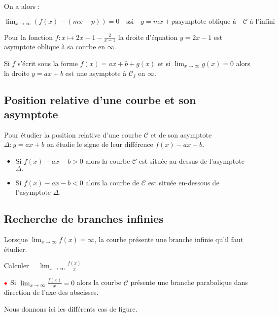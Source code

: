 On a alors :

\begin{definition}
$\displaystyle \lim_{x \to \infty}\left(f(x)-(mx+p)\right)=0 \quad\text{ssi}\quad y=mx+p \text{asymptote oblique  à}\quad \mathcal{C}\text{ à l'infini}$
\end{definition}
\begin{example}
Pour la fonction $f : x\mapsto 2x-1- \frac{2}{x-1} $
la droite d'équation   $y = 2x-1 $ est asymptote oblique à sa courbe en $ \infty $.

\end{example}

\begin{remark}
Si $ f $ s'écrit sous la forme $ f(x)= ax+b + g(x) $ et si $ \displaystyle\lim_{x \to \infty}g(x)=0 $  alors la droite $ y=ax+b $ est une asymptote à  $ \mathcal{C}_{f} $ en $ \infty. $
\end{remark}

\subsection{Position relative d'une courbe et son asymptote}
Pour étudier la position relative d'une courbe $\mathcal{C}$  et de son asymptote $\Delta : y=ax+b $  on étudie le signe de leur différence $ f(x)-ax-b$.
\begin{itemize}
\item Si $ f(x)-ax-b> 0$ alors la courbe  $ \mathcal{C} $ est  située  au-dessus de l'asymptote $ \Delta. $  
 
 \item Si $ f(x)-ax-b< 0$ alors la courbe de $ \mathcal{C} $ est  située  en-dessous de l'asymptote $ \Delta. $ 
\end{itemize}

\subsection{Recherche de branches infinies}
Lorsque  $ \displaystyle \lim_{x \to \infty}f(x)=\infty  $, la courbe présente une branche infinie qu'il faut étudier.

Calculer $\quad  \displaystyle \lim_{x \to \infty}\frac{f(x)}{x}$

$\color{red}\bullet $   Si $\lim_{x \to \infty}\frac{f(x)}{x}=0  $  alors la courbe $ \mathcal{C} $ présente une branche parabolique dans direction de l'axe des abscisses.

 Nous donnons ici les différents cas de figure.




